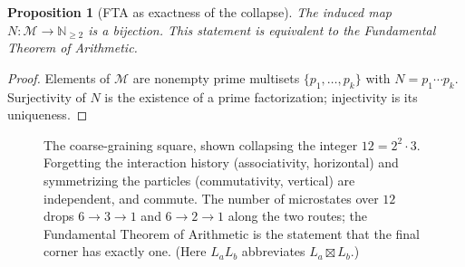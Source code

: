 \documentclass[11pt]{article}
\newcommand{\cT}{\mathcal{T}}   %
\newcommand{\cW}{\mathcal{W}}   %
\newcommand{\cB}{\mathcal{B}}   %
\newcommand{\cM}{\mathcal{M}}   %
\newcommand{\NN}{\mathbb{N}}
\numberwithin{equation}{section}
\theoremstyle{plain}
\newtheorem{proposition}[theorem]{Proposition}
\theoremstyle{definition}
\theoremstyle{remark}
\begin{document}
\begin{proposition}[FTA as exactness of the collapse]\label{prop:fta}
The induced map $N \colon \cM \to \NN_{\ge2}$ is a bijection. This statement is
equivalent to the Fundamental Theorem of Arithmetic.
\end{proposition}

\begin{proof}
Elements of $\cM$ are nonempty prime multisets $\{p_1,\dots,p_k\}$ with
$N = p_1\cdots p_k$. Surjectivity of $N$ is the existence of a prime factorization;
injectivity is its uniqueness. \end{proof}

\begin{figure}[t]
\centering
{}
\caption{The coarse-graining square, shown collapsing the integer $12 = 2^2\cdot 3$.
Forgetting the interaction history (associativity, horizontal) and symmetrizing the
particles (commutativity, vertical) are independent, and commute. The number of
microstates over $12$ drops $6 \to 3 \to 1$ and $6 \to 2 \to 1$ along the two routes;
the Fundamental Theorem of Arithmetic is the statement that the final corner has
exactly one. (Here $L_a L_b$ abbreviates $L_a \boxtimes L_b$.)}
\label{fig:square}
\end{figure}
\end{document}
